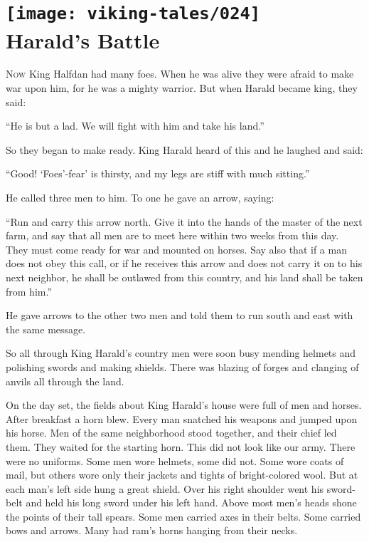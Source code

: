 \section[Harald's Battle]{
    \texttt{[image: viking-tales/024]}\\
    Harald's Battle}

\lettrine{N}{ow} King Halfdan had many foes. When he was alive they were
afraid to make war upon him, for he was a mighty warrior. But when Harald
became king, they said:

``He is but a lad. We will fight with him and take his land.''

So they began to make ready. King Harald heard of this and he laughed
and said:

``Good! `Foes'-fear' is thirsty, and my legs are stiff with much
sitting.''

He called three men to him. To one he gave an arrow, saying:

``Run and carry this arrow north. Give it into the hands of the master
of the next farm, and say that all men are to meet here within two weeks
from this day. They must come ready for war and mounted on horses. Say
also that if a man does not obey this call, or if he receives this arrow
and does not carry it on to his next neighbor, he shall be outlawed from
this country, and his land shall be taken from him.''

He gave arrows to the other two men and told them to run south and east
with the same message.

So all through King Harald's country men were soon busy mending helmets
and polishing swords and making shields. There was blazing of forges and
clanging of anvils all through the land.

On the day set, the fields about King Harald's house were full of men
and horses. After breakfast a horn blew. Every man snatched his weapons
and jumped upon his horse. Men of the same neighborhood stood together,
and their chief led them. They waited for the starting horn. This did
not look like our army. There were no uniforms. Some men wore helmets,
some did not. Some wore coats of mail, but others wore only their
jackets and tights of bright-colored wool. But at each man's left side
hung a great shield. Over his right shoulder went his sword-belt and
held his long sword under his left hand. Above most men's heads shone
the points of their tall spears. Some men carried axes in their belts.
Some carried bows and arrows. Many had ram's horns hanging from their
necks.

